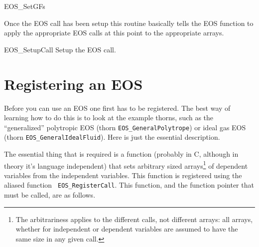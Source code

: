 \begin{FunctionDescription}{EOS\_SetGFs}
  \begin{Discussion}
    Once the EOS call has been setup this routine basically tells the
    EOS function to apply the appropriate EOS calls at this point to
    the appropriate arrays.
  \end{Discussion}

  \begin{SeeAlsoSection}
    \begin{SeeAlso}{EOS\_SetupCall}
      Setup the EOS call.
    \end{SeeAlso}
  \end{SeeAlsoSection}
\end{FunctionDescription}

\pagebreak
\section{Registering an EOS}

Before you can use an EOS one first has to be registered. The best way
of learning how to do this is to look at the example thorns, such as
the ``generalized'' polytropic EOS (thorn {\tt EOS\_GeneralPolytrope}) or
ideal gas EOS (thorn {\tt EOS\_GeneralIdealFluid}). Here is just the
essential description.

The essential thing that is required is a function (probably in C,
although in theory it's language independent) that sets arbitrary
sized arrays\footnote{The arbitrariness applies to the different
  calls, not different arrays: all arrays, whether for independent or
  dependent variables are assumed to have the same size in any given
  call.} of dependent variables from the independent variables. This
function is registered using the aliased function {\tt
  EOS\_RegisterCall}. This function, and the function pointer that
must be called, are as follows.




